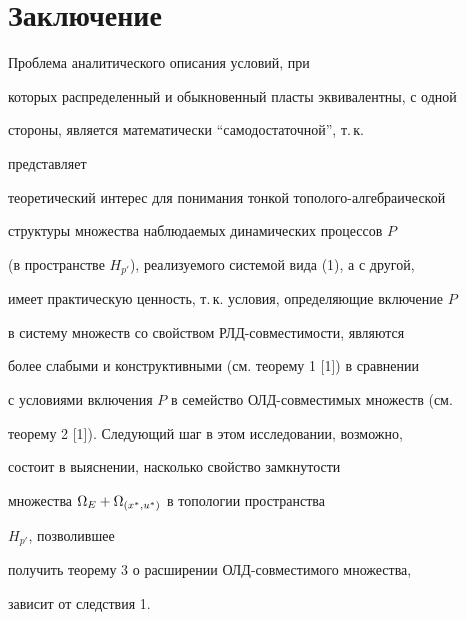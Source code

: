 \section{Заключение} 


 


Проблема аналитического описания условий, при 


которых распределенный и обыкновенный пласты эквивалентны, с одной 


стороны, является математически ``самодостаточной'', т.\,к. 


представляет 


теоретический интерес для понимания тонкой тополого-алгебраической 


структуры множества наблюдаемых динамических процессов $P$ 


(в пространстве $H_{p'}$), реализуемого системой вида (1), а с другой,


имеет практическую ценность, т.\,к. условия, определяющие включение $P$ 


в систему множеств со свойством РЛД-совместимости, являются 


более слабыми и конструктивными (см. теорему 1 [1]) в сравнении 


с условиями включения $P$ в семейство ОЛД-совместимых множеств (см. 


теорему 2 [1]). Следующий шаг в этом исследовании, возможно, 


состоит в выяснении, насколько свойство замкнутости 


множества $\Omega_E+\Omega_{{(x^*_{},u^*_{})}}$ в топологии пространства 


$H_{p'}$, позволившее 


получить теорему 3 о расширении ОЛД-совместимого множества, 


зависит от следствия 1. 


 


